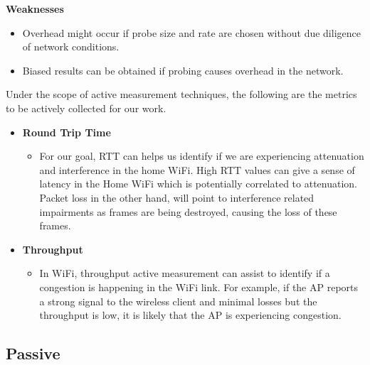 \textbf{Weaknesses}
\begin{itemize}
	\item Overhead might occur if probe size and rate are chosen without due diligence of network conditions.
	\item Biased results can be obtained if probing causes overhead in the network.
\end{itemize}


Under the scope of active measurement techniques, the following are the metrics to be actively collected for our work.

\begin{itemize}
	\item \textbf{Round Trip Time}
	\begin{itemize}
		\item For our goal, RTT can helps us identify if we are experiencing attenuation and interference in the home WiFi. High RTT values can give a sense of latency in the Home WiFi which is potentially correlated to attenuation. Packet loss in the other hand, will point to interference related impairments as frames are being destroyed, causing the loss of these frames.
	\end{itemize}
	
	\item \textbf{Throughput}
	\begin{itemize}
		\item In WiFi, throughput active measurement can assist to identify if a congestion is happening in the WiFi link. For example, if the AP reports a strong signal to the wireless client and minimal losses but the throughput is low, it is likely that the AP is experiencing congestion.
	\end{itemize}
\end{itemize}

\subsection{Passive}

